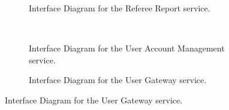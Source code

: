 \documentclass[12pt]{article}
\begin{document}
\begin{figure}[H]
\begin{subfigure}[H]{0.47\textwidth}
\centering	
{}
\caption{Interface Diagram for the Referee Report service.}
\end{subfigure}
~
\begin{subfigure}[H]{0.47\textwidth}
\centering	
{}
\caption{Interface Diagram for the User Account Management service.}
\end{subfigure}

\begin{subfigure}[H]{0.47\textwidth}
\centering	
{}
\caption{Interface Diagram for the User Gateway service.}
\end{subfigure}

\end{figure}
\end{document}
